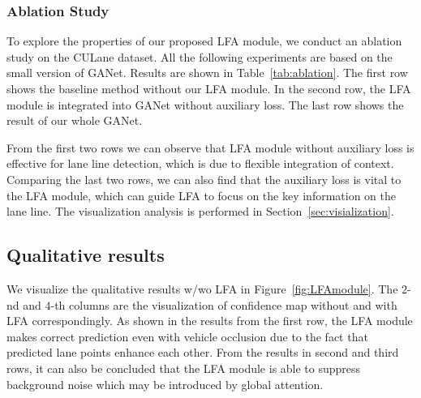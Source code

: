\documentclass[10pt,twocolumn,letterpaper]{article}
\begin{document}
\subsubsection{Ablation Study}
To explore the properties of our proposed LFA module, we conduct an ablation study on the CULane dataset. All the following experiments are based on the small version of GANet. Results are shown in Table~\ref{tab:ablation}.
The first row shows the baseline method without our LFA module.
In the second row, the LFA module is integrated into GANet without auxiliary loss.
The last row shows the result of our whole GANet.

From the first two rows we can observe that LFA module without auxiliary loss is effective for lane line detection, which is due to flexible integration of context.
Comparing the last two rows, we can also find that the auxiliary loss is vital to the LFA module, which can guide LFA to focus on the key information on the lane line. The visualization analysis is performed in Section~\ref{sec:visialization}.

\begin{table}[!htbp]
    \centering
    \caption{Ablation study of LFA module}
    \label{tab:ablation}
\end{table}

\subsection{Qualitative results\label{sec:visialization}}
We visualize the qualitative results w/wo LFA in Figure~\ref{fig:LFAmodule}. The $2$-nd and $4$-th columns are the visualization of confidence map without and with LFA correspondingly. 
As shown in the results from the first row, the LFA module makes correct prediction even with vehicle occlusion due to the fact that predicted lane points enhance each other.
From the results in second and third rows, it can also be concluded that the LFA module is able to suppress background noise which may be introduced by global attention.
\end{document}
